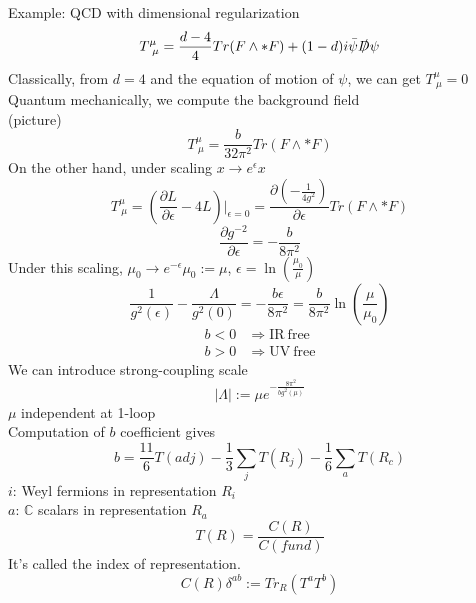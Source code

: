 \documentclass[type = bachelor]{fduthesis-en}
\begin{document}
\noindent Example: QCD with dimensional regularization
\begin{equation}
T^\mu_{\ \mu}=\frac{d-4}{4}Tr(F\wedge*F)+(1-d)i\bar{\psi}\slashed{D}\psi
\end{equation}
Classically, from $d=4$ and the equation of motion of $\psi$, we can get $T^\mu_{\ \mu}=0$\\
Quantum mechanically, we compute the background field\\
(picture)\\
\begin{equation}
T^\mu_{\ \mu}=\frac{b}{32\pi^2}Tr(F\wedge*F)
\end{equation} 
On the other hand, under scaling $x\rightarrow e^\epsilon x$
\begin{equation}
T^\mu_{\ \mu}=(\frac{\partial L}{\partial\epsilon}-4L)|_{\epsilon=0}=\frac{\partial(-\frac{1}{4g^2})}{\partial\epsilon}Tr(F\wedge*F)
\end{equation}
\begin{equation}
\frac{\partial g^{-2}}{\partial\epsilon}=-\frac{b}{8\pi^2}
\end{equation}
Under this scaling, $\mu_0\rightarrow e^{-\epsilon}\mu_0:=\mu$, $\epsilon=\ln(\frac{\mu_0}{\mu})$
\begin{equation}
\frac{1}{g^2(\epsilon)}-\frac{\Lambda}{g^2(0)}=-\frac{b\epsilon}{8\pi^2}=\frac{b}{8\pi^2}\ln(\frac{\mu}{\mu_0})
\end{equation}
\begin{align}
b<0&\Rightarrow \mathrm{IR\ free}\\
b>0&\Rightarrow \mathrm{UV\ free}
\end{align}
We can introduce strong-coupling scale
\begin{equation}
\left|\Lambda\right|:=\mu e^{-\frac{8\pi^2}{bg^2(\mu)}}
\end{equation}
$\mu$ independent at 1-loop\\
Computation of $b$ coefficient gives 
\begin{equation}
b=\frac{11}{6}T(adj)-\frac{1}{3}\sum_jT(R_j)-\frac{1}{6}\sum_aT(R_c)
\end{equation}
$i$: Weyl fermions in representation $R_i$\\
$a$: $\mathbb{C}$ scalars in representation $R_a$
\begin{equation}
T(R)=\frac{C(R)}{C(fund)}
\end{equation}
It's called the index of representation.
\begin{equation}
C(R)\delta^{ab}:=Tr_R(T^aT^b)
\end{equation} 
\end{document}
